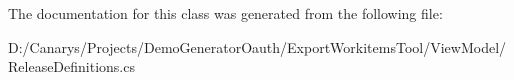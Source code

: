 The documentation for this class was generated from the following file\+:\begin{DoxyCompactItemize}
\item 
D\+:/\+Canarys/\+Projects/\+Demo\+Generator\+Oauth/\+Export\+Workitems\+Tool/\+View\+Model/Release\+Definitions.\+cs\end{DoxyCompactItemize}
